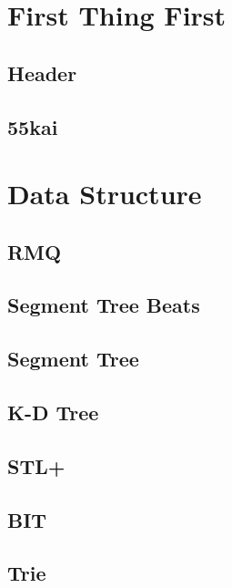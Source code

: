 \section{First Thing First}
\subsection{Header}
\raggedbottom
\hrulefill
\subsection{55kai}
\raggedbottom

\section{Data Structure}
\subsection{RMQ}
\raggedbottom
\hrulefill
\subsection{Segment Tree Beats}
\raggedbottom
\hrulefill
\subsection{Segment Tree}
\raggedbottom
\hrulefill
\subsection{K-D Tree}
\raggedbottom
\hrulefill
\subsection{STL+}
\raggedbottom
\hrulefill
\subsection{BIT}
\raggedbottom
\hrulefill
\subsection{Trie}
\raggedbottom
\hrulefill
